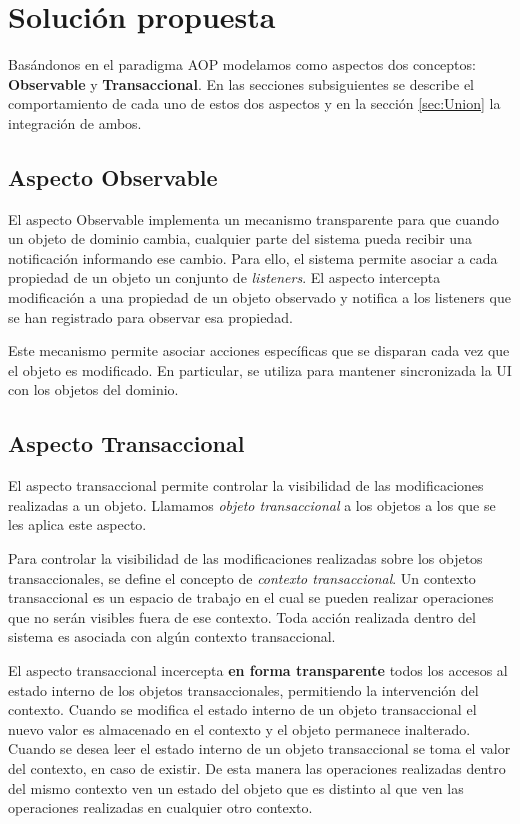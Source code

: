 \section{Solución propuesta}
\label{Solucion}

	Basándonos en el paradigma AOP modelamos como aspectos dos conceptos: {\bf Observable} y  {\bf Transaccional}.
	En las secciones subsiguientes se describe el comportamiento de cada uno de
	estos dos aspectos y en la sección \ref{sec:Union} la integración de ambos.

	\subsection{Aspecto Observable}
	\label{aspectoObservable}
		El aspecto Observable implementa un mecanismo transparente para que cuando un
		objeto de dominio cambia, cualquier parte del sistema pueda recibir una
		notificación informando ese cambio.
		Para ello, el sistema permite asociar a cada propiedad de un objeto un conjunto de \emph{listeners}. 
		El aspecto intercepta modificación a una propiedad
		de un objeto observado y notifica a los listeners que se han registrado para observar esa propiedad.
		
		Este mecanismo permite asociar acciones específicas que se disparan cada vez
		que el objeto es modificado. En particular, se utiliza para mantener
		sincronizada la UI con los objetos del dominio.

	\subsection{Aspecto Transaccional}
	\label{aspectoTransaccional}
		El aspecto transaccional permite controlar la visibilidad de las modificaciones
		realizadas a un objeto.
		Llamamos \emph{objeto transaccional} a los objetos a los que se les aplica este aspecto.
		
		Para controlar la visibilidad de las modificaciones realizadas sobre los objetos transaccionales, 
		se define el concepto de \emph{contexto transaccional}.
		Un contexto transaccional es un espacio de trabajo en el cual se pueden
		realizar operaciones que no serán visibles fuera de ese contexto.
		Toda acción realizada dentro del sistema es asociada con algún contexto transaccional.
		
		El aspecto transaccional incercepta \textbf{en forma transparente} todos los accesos al
		estado interno de los objetos transaccionales, permitiendo la intervención del contexto.
		Cuando se modifica el estado interno de un objeto transaccional el nuevo valor es almacenado en el contexto y 
		el objeto permanece inalterado.
		Cuando se desea leer el estado interno de un objeto transaccional se toma el valor del contexto, en caso de existir.
		De esta manera las operaciones realizadas dentro del mismo contexto ven un estado del objeto que es distinto 
		al que ven las operaciones realizadas en cualquier otro contexto.
	
